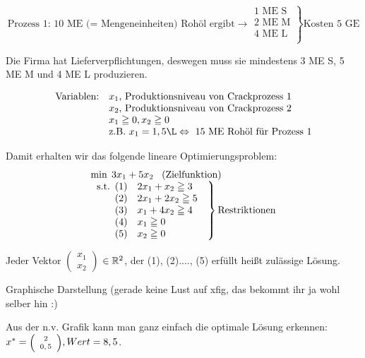 \[\mbox{Prozess 1: 10 ME (= Mengeneinheiten) Rohöl ergibt} \longrightarrow
\left.
\begin{array}{l}
\mbox{1 ME S}\\
\mbox{2 ME M}\\
\mbox{4 ME L}\\
\end{array}\right\}\mbox{Kosten 5 GE}\]

Die Firma hat Lieferverpflichtungen, deswegen muss sie mindestens 3 ME S, 5
ME M und 4 ME L produzieren.

\[\begin{array}{ll}
\mbox{Variablen:}& x_{1}\mbox{, Produktionsniveau von Crackprozess 1}\\
&x_{2}\mbox{, Produktionsniveau von Crackprozess 2}\\
&x_{1}\geqq 0, x_{2}\geqq 0\\
&\mbox{z.B. }x_{1} = 1,5 \L\Leftrightarrow \mbox{ 15 ME Rohöl für Prozess 1}
\end{array}\]

Damit erhalten wir das folgende lineare Optimierungsproblem:\\
\[\begin{array}{l}
\min\; 3x_{1}+5x_{2} \;\;\; \mbox{(Zielfunktion)}\\
\left.\begin{array}{l}\mbox{s.t.}\begin{array}[t]{rl}
(1)& 2x_{1} + x_{2} \geqq 3\\
(2)&2x_{1}+ 2x_{2} \geqq 5\\
(3)&x_{1}+ 4x_{2} \geqq 4\\
(4)&x_{1} \geqq 0\\
(5)&x_{2} \geqq 0\\
\end{array}\end{array}\right\}\mbox{Restriktionen}\end{array}
\]

Jeder Vektor {\scriptsize$\left(\begin{array}{c}x_{1}\\x_{2}\end{array}\right)$} $\in \mathbb{R}^{2}$, der
(1), (2)...., (5) erfüllt heißt zulässige Lösung.

Graphische Darstellung (gerade keine Lust auf xfig, das bekommt ihr ja wohl
selber hin :)

Aus der n.v. Grafik kann man ganz einfach die optimale Lösung erkennen:
$x^{*} = \mbox{\scriptsize
$\left(\begin{array}{c}2\\0,5\end{array}\right)$}, Wert = 8,5$.

